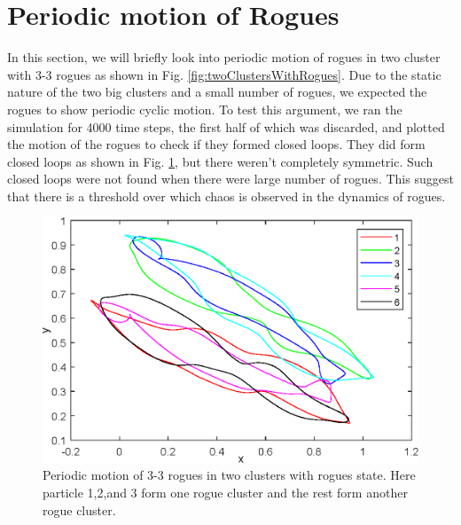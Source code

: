 \documentclass[superscriptaddress,reprint,amssymb, amsmath,aps, pre]{revtex4-1}
\begin{document}
\section{Periodic motion of Rogues}
{
    In this section, we will briefly look into periodic motion of rogues in two cluster with 3-3 rogues as shown in Fig. \ref{fig:twoClustersWithRogues}. Due to the static nature of the two big clusters and a small number of rogues, we expected the rogues to show periodic cyclic motion. To test this argument, we ran the simulation for 4000 time steps, the first half of which was discarded, and plotted the motion of the rogues to check if they formed closed loops. They did form closed loops as shown in Fig. \ref{fig:cyclicMotion}, but there weren't completely symmetric. Such closed loops were not found when there were large number of rogues. This suggest that there is a threshold over which chaos is observed in the dynamics of rogues. 
    
    \begin{figure}
        \includegraphics[width = \linewidth]{cyclicMotion.eps}
        \caption{Periodic motion of 3-3 rogues in two clusters with rogues state. Here particle 1,2,and 3 form one rogue cluster and the rest form another rogue cluster.}
        \label{fig:cyclicMotion}
    \end{figure}
}
\end{document}
